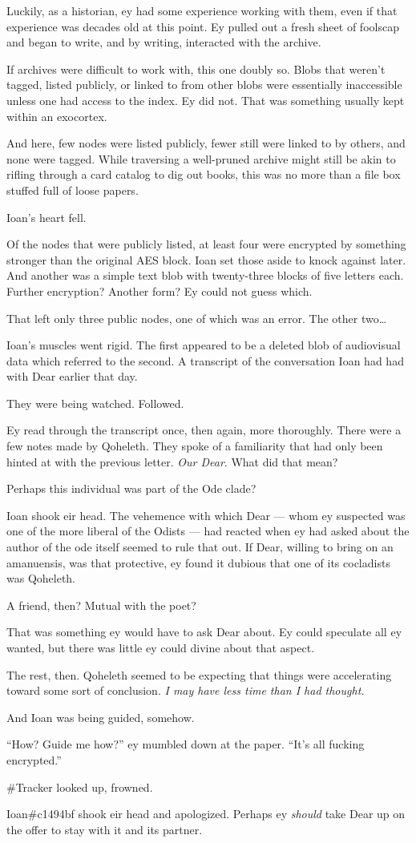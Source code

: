 Luckily, as a historian, ey had some experience working with them, even if that experience was decades old at this point. Ey pulled out a fresh sheet of foolscap and began to write, and by writing, interacted with the archive.

If archives were difficult to work with, this one doubly so. Blobs that weren't tagged, listed publicly, or linked to from other blobs were essentially inaccessible unless one had access to the index. Ey did not. That was something usually kept within an exocortex.

And here, few nodes were listed publicly, fewer still were linked to by others, and none were tagged. While traversing a well-pruned archive might still be akin to rifling through a card catalog to dig out books, this was no more than a file box stuffed full of loose papers.

Ioan's heart fell.

Of the nodes that were publicly listed, at least four were encrypted by something stronger than the original AES block. Ioan set those aside to knock against later. And another was a simple text blob with twenty-three blocks of five letters each. Further encryption? Another form? Ey could not guess which.

That left only three public nodes, one of which was an error. The other two\ldots{}

Ioan's muscles went rigid. The first appeared to be a deleted blob of audiovisual data which referred to the second. A transcript of the conversation Ioan had had with Dear earlier that day.

They were being watched. Followed.

Ey read through the transcript once, then again, more thoroughly. There were a few notes made by Qoheleth. They spoke of a familiarity that had only been hinted at with the previous letter. \emph{Our Dear}. What did that mean?

Perhaps this individual was part of the Ode clade?

Ioan shook eir head. The vehemence with which Dear — whom ey suspected was one of the more liberal of the Odists — had reacted when ey had asked about the author of the ode itself seemed to rule that out. If Dear, willing to bring on an amanuensis, was that protective, ey found it dubious that one of its cocladists was Qoheleth.

A friend, then? Mutual with the poet?

That was something ey would have to ask Dear about. Ey could speculate all ey wanted, but there was little ey could divine about that aspect.

The rest, then. Qoheleth seemed to be expecting that things were accelerating toward some sort of conclusion. \emph{I may have less time than I had thought.}

And Ioan was being guided, somehow.

``How? Guide me how?'' ey mumbled down at the paper. ``It's all fucking encrypted.''

\#Tracker looked up, frowned.

Ioan\#c1494bf shook eir head and apologized. Perhaps ey \emph{should} take Dear up on the offer to stay with it and its partner.
